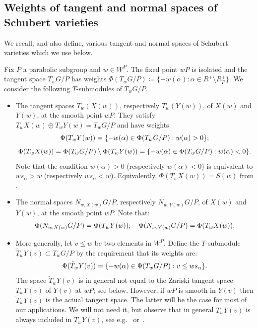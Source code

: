 \subsection{Weights of tangent and normal spaces of Schubert varieties}\label{ss:weights} We recall, and also define, various tangent and normal spaces of Schubert varieties which we use below. 

Fix $P$ a parabolic subgroup and $w \in W^P$. The fixed point $wP$ is isolated and the tangent space $T_w G/P$ has weights
$\Phi(T_w G/P) \coloneqq  \{ - w(\alpha) : \alpha \in R^+ \setminus R_P^+\}$.  
We consider the following $T$-submodules of $T_w G/P$.

\begin{itemize} \item The tangent spaces $T_w (X(w))$, respectively $T_w(Y(w))$, of $X(w)$ and $Y(w)$, at the smooth point $wP$. They satisfy $T_w X(w) \oplus T_w Y(w) = T_w G/P$ and have weights
	\[ \Phi(T_w Y(w)) = \{ - w (\alpha) \in \Phi (T_w G/P): w(\alpha) > 0 \} \/; \] 
	\[ \Phi(T_w X(w)) = \Phi(T_w G/P) \setminus \Phi(T_w Y(w)) = \{ - w (\alpha) \in \Phi (T_w G/P): w(\alpha) < 0 \} \/. \]
	Note that the condition $w(\alpha)>0$ (respectively $w(\alpha)<0$) is equivalent to $w s_\alpha > w$ (respectively $ws_\alpha < w$). Equivalently, $\Phi(T_w X(w))=S(w)$ from .
	\item The normal spaces $N_{w,X(w)}G/P$, respectively $N_{w,Y(w)}G/P$, of $X(w)$ and $Y(w)$, at the smooth point $wP$. Note that:
	\[ \Phi(N_{w,X(w)}G/P) =\Phi(T_w Y(w))\/; \quad \Phi(N_{w,Y(w)} G/P) =\Phi(T_w X(w)) \/. \]
	
	\item More generally, let $v \le w$ be two elements in $W^P$. Define the $T$-submodule $\tilde{T}_w Y(v)\subset T_w G/P$ by the requirement that its weights are:
	\[ \Phi(\tilde{T}_w Y(v)) = \{ -w(\alpha) \in \Phi(T_w G/P): v \leq w s_\alpha \} \/. \]
	The space $\tilde{T}_w Y(v)$ is in general not equal to the Zariski tangent 
	space $T_w Y(v)$ of $Y(v)$ at $wP$; see  below.
	However, if $wP$ is smooth in $Y(v)$ then $\tilde{T}_w Y(v)$ is the actual tangent 
	space. The latter will be the case for most of our applications. We will not need it, but observe
	that in general $\tilde{T}_w Y(v)$ is always included in $T_w Y(v)$, see e.g.~\cite{carrell:bruhat}
	or~\cite[Prop.~12.1.7]{kumar:book}.
	

\end{itemize}
